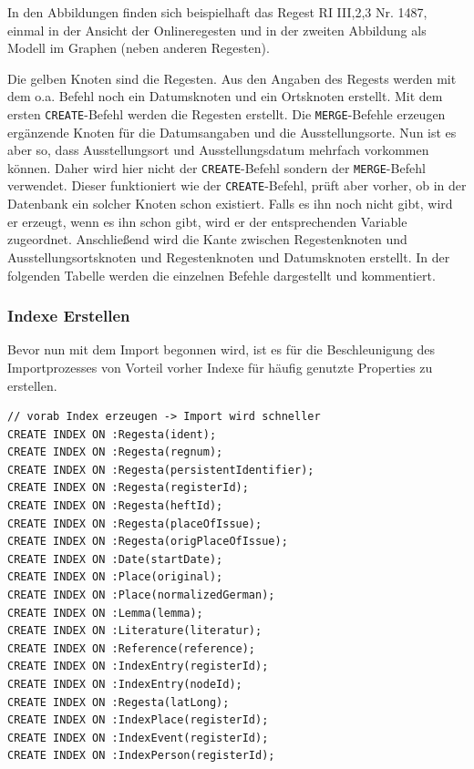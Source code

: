 \documentclass[12pt,ngerman,]{article}
\begin{document}
In den Abbildungen finden sich beispielhaft das Regest RI III,2,3 Nr.
1487, einmal in der Ansicht der Onlineregesten und in der zweiten
Abbildung als Modell im Graphen (neben anderen Regesten).

Die gelben Knoten sind die Regesten. Aus den Angaben des Regests werden
mit dem o.a. Befehl noch ein Datumsknoten und ein Ortsknoten erstellt.
Mit dem ersten \texttt{CREATE}-Befehl werden die Regesten erstellt. Die
\texttt{MERGE}-Befehle erzeugen ergänzende Knoten für die Datumsangaben
und die Ausstellungsorte. Nun ist es aber so, dass Ausstellungsort und
Ausstellungsdatum mehrfach vorkommen können. Daher wird hier nicht der
\texttt{CREATE}-Befehl sondern der \texttt{MERGE}-Befehl verwendet.
Dieser funktioniert wie der \texttt{CREATE}-Befehl, prüft aber vorher,
ob in der Datenbank ein solcher Knoten schon existiert. Falls es ihn
noch nicht gibt, wird er erzeugt, wenn es ihn schon gibt, wird er der
entsprechenden Variable zugeordnet. Anschließend wird die Kante zwischen
Regestenknoten und Ausstellungsortsknoten und Regestenknoten und
Datumsknoten erstellt. In der folgenden Tabelle werden die einzelnen
Befehle dargestellt und kommentiert.

\subsubsection{Indexe Erstellen}\label{indexe-erstellen}

Bevor nun mit dem Import begonnen wird, ist es für die Beschleunigung
des Importprozesses von Vorteil vorher Indexe für häufig genutzte
Properties zu erstellen.

\begin{verbatim}
// vorab Index erzeugen -> Import wird schneller
CREATE INDEX ON :Regesta(ident);
CREATE INDEX ON :Regesta(regnum);
CREATE INDEX ON :Regesta(persistentIdentifier);
CREATE INDEX ON :Regesta(registerId);
CREATE INDEX ON :Regesta(heftId);
CREATE INDEX ON :Regesta(placeOfIssue);
CREATE INDEX ON :Regesta(origPlaceOfIssue);
CREATE INDEX ON :Date(startDate);
CREATE INDEX ON :Place(original);
CREATE INDEX ON :Place(normalizedGerman);
CREATE INDEX ON :Lemma(lemma);
CREATE INDEX ON :Literature(literatur);
CREATE INDEX ON :Reference(reference);
CREATE INDEX ON :IndexEntry(registerId);
CREATE INDEX ON :IndexEntry(nodeId);
CREATE INDEX ON :Regesta(latLong);
CREATE INDEX ON :IndexPlace(registerId);
CREATE INDEX ON :IndexEvent(registerId);
CREATE INDEX ON :IndexPerson(registerId);
\end{verbatim}
\end{document}

